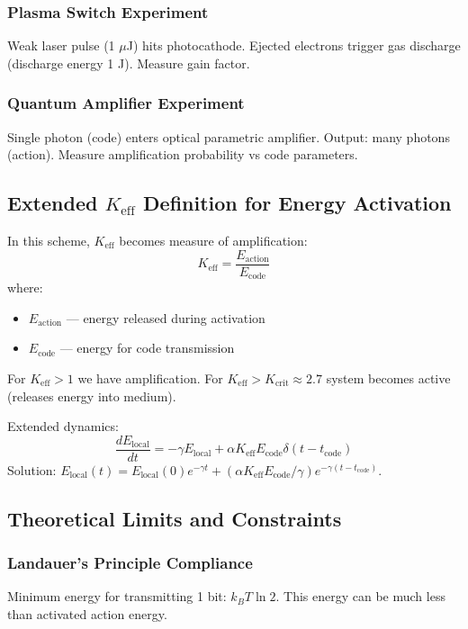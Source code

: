 \documentclass[11pt,a4paper]{article}
\begin{document}
	\subsubsection{Plasma Switch Experiment}
	Weak laser pulse (1 $\mu$J) hits photocathode. Ejected electrons trigger gas discharge (discharge energy 1 J). Measure gain factor.
	
	\subsubsection{Quantum Amplifier Experiment}
	Single photon (code) enters optical parametric amplifier. Output: many photons (action). Measure amplification probability vs code parameters.
	
	\subsection{Extended $K_{\mathrm{eff}}$ Definition for Energy Activation}
	
	In this scheme, $K_{\mathrm{eff}}$ becomes measure of amplification:
	\begin{equation}
		K_{\mathrm{eff}} = \frac{E_{\text{action}}}{E_{\text{code}}}
	\end{equation}
	where:
	\begin{itemize}
		\item $E_{\text{action}}$ — energy released during activation
		\item $E_{\text{code}}$ — energy for code transmission
	\end{itemize}
	
	For $K_{\mathrm{eff}} > 1$ we have amplification. For $K_{\mathrm{eff}} > K_{\text{crit}} \approx 2.7$ system becomes active (releases energy into medium).
	
	Extended dynamics:
	\begin{equation}
		\frac{dE_{\text{local}}}{dt} = -\gamma E_{\text{local}} + \alpha K_{\mathrm{eff}} E_{\text{code}} \delta(t - t_{\text{code}})
	\end{equation}
	Solution: $E_{\text{local}}(t) = E_{\text{local}}(0) e^{-\gamma t} + (\alpha K_{\mathrm{eff}} E_{\text{code}}/\gamma) e^{-\gamma(t-t_{\text{code}})}$.
	
	\subsection{Theoretical Limits and Constraints}
	
	\subsubsection{Landauer's Principle Compliance}
	Minimum energy for transmitting 1 bit: $k_B T \ln 2$. This energy can be much less than activated action energy.
	
\end{document}
